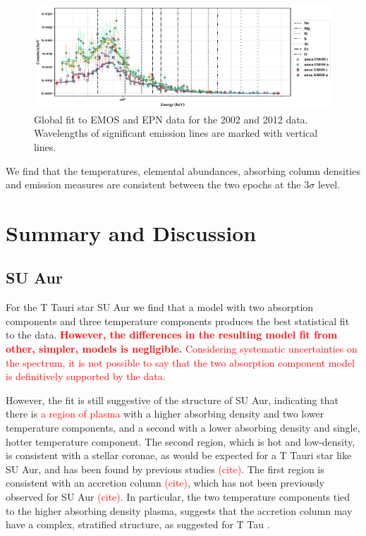 \documentclass[twocolumn]{aastex631}
\newcommand{\citesomething}[1]{\textcolor{red}{(cite#1)}}
\newcommand{\red}[1]{\textcolor{red}{#1}}
\begin{document}
\begin{figure}
    \centering
    \includegraphics[width=0.85\linewidth]{Figures/AB Aur/figure_global_fit_energy.pdf}
    \caption{Global fit to EMOS and EPN data for the 2002 and 2012 data. Wavelengths of significant emission lines are marked with vertical lines.}
    \label{fig:ab_aur_fit}
\end{figure}

We find that the temperatures, elemental abundances, absorbing column densities and emission measures are consistent between the two epochs at the $3\sigma$ level. 

\section{Summary and Discussion}\label{sec:discussion}

\subsection{SU Aur}

For the T Tauri star SU Aur we find that a model with two absorption components and three temperature components produces the best statistical fit to the data. \red{\textbf{However, the differences in the resulting model fit from other, simpler, models is negligible.} Considering systematic uncertainties on the spectrum, it is not possible to say that the two absorption component model is definitively supported by the data.} 

However, the fit is still suggestive of the structure of SU Aur, indicating that there is \red{a region of plasma} with a higher absorbing density and two lower temperature components, and a second with a lower absorbing density and single, hotter temperature component. The second region, which is hot and low-density, is consistent with a stellar coronae, as would be expected for a T Tauri star like SU Aur, and has been found by previous studies \citesomething{}. The first region is consistent with an accretion column \citesomething{}, which has not been previously observed for SU Aur \citesomething{}. 
In particular, the two temperature components tied to the higher absorbing density plasma, suggests that the accretion column may have a complex, stratified structure, as suggested for T Tau \citep{schneider_multiepoch_2018}. 
\end{document}
